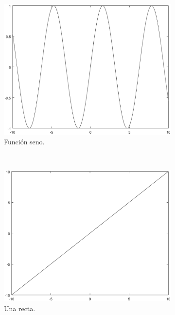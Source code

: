\begin{figure}[ht!]
	\begin{subfigure}[ht!]{.32\linewidth}
		\centering
		\includegraphics[width=0.9\linewidth]{img/grafica_seno.eps}
		\caption{Función seno.}
		\label{fig:sub_grafica_1}
	\end{subfigure}
	~ %
	\begin{subfigure}[ht!]{.32\linewidth}
		\centering
		\includegraphics[width=0.9\linewidth]{img/grafica_recta.eps}
		\caption{Una recta.}
		\label{fig:sub_grafica_2}
	\end{subfigure}
	~ %
	\begin{subfigure}[ht!]{.32\linewidth}
		\centering

\end{subfigure}
\end{figure}
